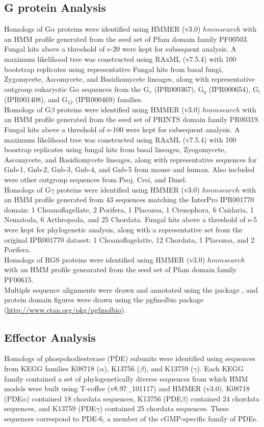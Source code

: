 \subsection*{G protein Analysis}
Homologs of G$\alpha$ proteins were identified using HMMER (v3.0) $hmmsearch$ with an HMM profile generated from the seed set of Pfam domain family PF00503. Fungal hits above a threshold of e-20 were kept for subsequent analysis. A maximum likelihood tree was constructed using RAxML (v7.5.4) with 100 bootstrap replicates using representative Fungal hits from basal fungi, Zygomycete, Ascomycete, and Basidiomycete lineages, along with representative outgroup eukaryotic G$\alpha$ sequences from the G$_{s}$ (IPR000367), G$_{q}$ (IPR000654), G$_{i}$ (IPR001408), and G$_{12}$ (IPR000469) families.\\
\indent Homologs of G$\beta$ proteins were identified using HMMER (v3.0) $hmmsearch$ with an HMM profile generated from the seed set of PRINTS domain family PR00319. Fungal hits above a threshold of e-100 were kept for subsequent analysis. A maximum likelihood tree was constructed using RAxML (v7.5.4) with 100 boostrap replicates using fungal hits from basal lineages, Zyogomycete, Ascomycete, and Basidiomycete lineages, along with representative sequences for Gnb-1, Gnb-2, Gnb-3, Gnb-4, and Gnb-5 from mouse and human. Also included were other outgroup sequences from Psoj, Crei, and Dmel.\\
\indent Homologs of G$\gamma$ proteins were identified using HMMER (v3.0) $hmmsearch$ with an HMM profile generated from 43 sequences matching the InterPro IPR001770 domain: 1 Choanoflagellate, 2 Porifera, 1 Placozoa, 1 Ctenophora, 6 Cnidaria, 1 Nematoda, 6 Arthropoda, and 25 Chordata. Fungal hits above a threshold of e-5 were kept for phylogenetic analysis, along with a representative set from the original IPR001770 dataset: 1 Choanoflagelatte, 12 Chordata, 1 Placozoa, and 2 Porifera. \\
\indent Homologs of RGS proteins were identified using HMMER (v3.0) $hmmsearch$ with an HMM profile genearated from the seed set of Pfam domain family PF00615.\\
\indent Multiple sequence alignments were drawn and annotated using the \TeXshade package \cite{Beitz2000texshade}, and protein domain figures were drawn using the pgfmolbio package (\url{http://www.ctan.org/pkg/pgfmolbio}).\\
\subsection*{Effector Analysis}
\indent Homologs of phospohodiesterase (PDE) subunits were identified using sequences from KEGG families K08718 ($\alpha$), K13756 ($\beta$), and K13759 ($\gamma$). Each KEGG family contained a set of phylogenetically diverse sequences from which HMM models were built using T-coffee (v8.97\_101117) and HMMER (v3.0). K08718 (PDE$\alpha$) contained 18 chordata sequences, K13756 (PDE$\beta$) contained 24 chordata sequences, and K13759 (PDE$\gamma$) contained 25 chordata sequences. These sequences correspond to PDE-6, a member of the cGMP-specific  family of PDEs.\\

